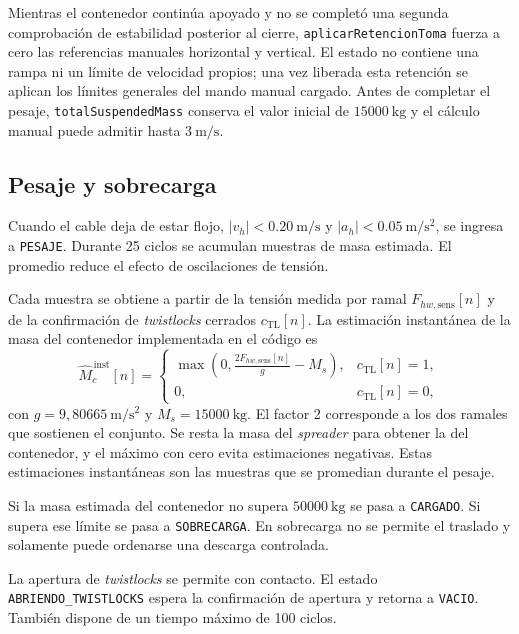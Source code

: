 \documentclass[a4paper,10pt,onecolumn,journal]{ieeeconf}
\numberwithin{equation}{section}
\begin{document}
Mientras el contenedor continúa apoyado y no se completó una segunda comprobación de estabilidad posterior al cierre, \texttt{aplicarRetencionToma} fuerza a cero las referencias manuales horizontal y vertical. El estado  no contiene una rampa ni un límite de velocidad propios; una vez liberada esta retención se aplican los límites generales del mando manual cargado. Antes de completar el pesaje, \texttt{totalSuspendedMass} conserva el valor inicial de $15000~\mathrm{kg}$ y el cálculo manual puede admitir hasta $3~\mathrm{m/s}$.


\subsection{Pesaje y sobrecarga}
Cuando el cable deja de estar flojo, $|v_h|<0.20~\mathrm{m/s}$ y $|a_h|<0.05~\mathrm{m/s^2}$, se ingresa a \texttt{PESAJE}. Durante 25 ciclos se acumulan muestras de masa estimada. El promedio reduce el efecto de oscilaciones de tensión.

Cada muestra se obtiene a partir de la tensión medida por ramal $F_{hw,\mathrm{sens}}[n]$ y de la confirmación de \textit{twistlocks} cerrados $c_{\mathrm{TL}}[n]$. La estimación instantánea de la masa del contenedor implementada en el código es
\begin{equation}
\boxed{
\widehat M_c^{\,\mathrm{inst}}[n]=
\begin{cases}
\displaystyle\max\left(0,\frac{2F_{hw,\mathrm{sens}}[n]}{g}-M_s\right),
& c_{\mathrm{TL}}[n]=1,\\[6pt]
0, & c_{\mathrm{TL}}[n]=0,
\end{cases}}
\end{equation}
con $g=9{,}80665~\mathrm{m/s^2}$ y $M_s=15000~\mathrm{kg}$. El factor 2 corresponde a los dos ramales que sostienen el conjunto. Se resta la masa del \textit{spreader} para obtener la del contenedor, y el máximo con cero evita estimaciones negativas. Estas estimaciones instantáneas son las muestras que se promedian durante el pesaje.

Si la masa estimada del contenedor no supera $50000~\mathrm{kg}$ se pasa a \texttt{CARGADO}. Si supera ese límite se pasa a \texttt{SOBRECARGA}. En sobrecarga no se permite el traslado y solamente puede ordenarse una descarga controlada.

La apertura de \textit{twistlocks} se permite con contacto. El estado \texttt{ABRIENDO\_TWISTLOCKS} espera la confirmación de apertura y retorna a \texttt{VACIO}. También dispone de un tiempo máximo de 100 ciclos.
\end{document}
